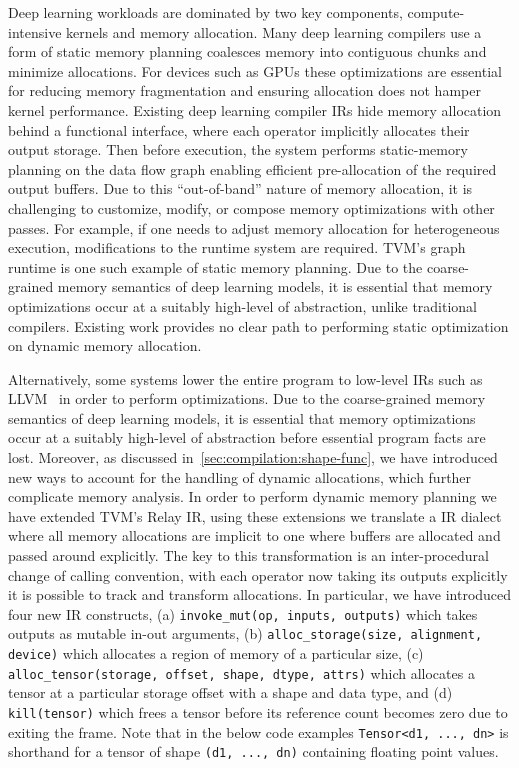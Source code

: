 Deep learning workloads are dominated by two key components,
    compute-intensive kernels and memory allocation.
Many deep learning compilers use a form of static memory planning
    coalesces memory into contiguous chunks and minimize allocations.
For devices such as GPUs these optimizations are essential for
    reducing memory fragmentation and ensuring allocation does not hamper kernel performance.
Existing deep learning compiler IRs hide memory allocation behind a
    functional interface, where each operator implicitly allocates their output storage.
Then before execution, the system performs static-memory planning on the data
    flow graph enabling efficient pre-allocation of the required output buffers.
Due to this ``out-of-band'' nature of memory allocation,
    it is challenging to customize, modify, or compose memory optimizations with other passes.
For example, if one needs to adjust memory allocation for heterogeneous execution,
    modifications to the runtime system are required.
TVM's graph runtime is one such example of static memory planning.
Due to the coarse-grained memory semantics of deep learning models,
    it is essential that memory optimizations occur at a suitably high-level of abstraction,
    unlike traditional compilers.
Existing work provides no clear path to performing static optimization on dynamic memory
    allocation.

Alternatively, some systems lower the entire program to low-level IRs such as
  LLVM~\citep{llvm} in order to perform optimizations.
Due to the coarse-grained memory semantics of deep learning models,
  it is essential that memory optimizations occur at a suitably high-level of abstraction before essential program facts are lost.
Moreover, as discussed in~\autoref{sec:compilation:shape-func}, we have introduced new ways to account for the handling of dynamic allocations,
  which further complicate memory analysis.
In order to perform dynamic memory planning we have extended TVM's Relay IR,
  using these extensions we translate a IR dialect where all memory allocations are
  implicit to one where buffers are allocated and passed around explicitly.
  The key to this transformation is an inter-procedural change of calling convention,
  with each operator now taking its outputs explicitly it is possible to track and transform allocations.
In particular, we have introduced four new IR constructs,
  (a) \verb|invoke_mut(op, inputs, outputs)| which takes outputs as mutable in-out arguments,
  (b) \texttt{alloc\_storage(size, alignment, device)} which allocates a region of memory of a particular size,
  (c) \texttt{alloc\_tensor(storage, offset, shape, dtype, attrs)} which allocates a tensor at a particular storage offset
    with a shape and data type, and
  (d) \verb|kill(tensor)| which frees a tensor before its reference count becomes zero due to exiting the frame.
Note that in the below code examples \texttt{Tensor<d1, ..., dn>}
is shorthand for a tensor of shape \texttt{(d1, ..., dn)} containing floating point values.

